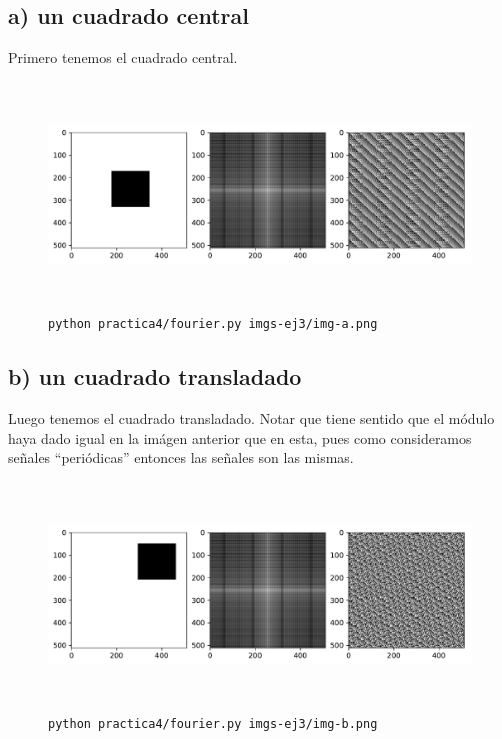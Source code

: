 \documentclass[11pt, spanish]{article}
\begin{document}
\subsection{a) un cuadrado central}
Primero tenemos el cuadrado central.
\begin{figure}[H]
\centering
  \includegraphics[height=6cm]{informe-imgs/ej3-a.pdf}
  \caption{\texttt{python practica4/fourier.py imgs-ej3/img-a.png}}
\end{figure}

\subsection{b) un cuadrado transladado}

Luego tenemos el cuadrado transladado. Notar que tiene sentido que el módulo haya dado igual en la imágen anterior que
en esta, pues como consideramos señales ``periódicas'' entonces las señales son las mismas.
\begin{figure}[H]
\centering
  \includegraphics[height=6cm]{informe-imgs/ej3-b.pdf}
  \caption{\texttt{python practica4/fourier.py imgs-ej3/img-b.png}}
\end{figure}
\end{document}
